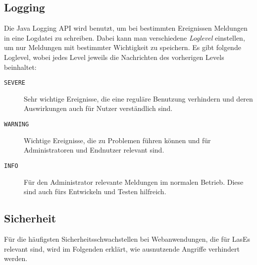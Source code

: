 
\subsection{Logging}\label{subsec:logging}
Die Java Logging API wird benutzt, um bei bestimmten Ereignissen Meldungen in eine Logdatei zu schreiben.
Dabei kann man verschiedene \emph{Loglevel} einstellen, um nur Meldungen mit bestimmter Wichtigkeit zu speichern.
Es gibt folgende Loglevel, wobei jedes Level jeweils die Nachrichten des vorherigen Levels beinhaltet:
\begin{description}
    \item[\texttt{SEVERE}] Sehr wichtige Ereignisse, die eine reguläre Benutzung verhindern und deren Auswirkungen auch für Nutzer verständlich sind.
    \item[\texttt{WARNING}] Wichtige Ereignisse, die zu Problemen führen können und für Administratoren und Endnutzer relevant sind.
    \item[\texttt{INFO}] Für den Administrator relevante Meldungen im normalen Betrieb. Diese sind auch fürs Entwickeln und Testen hilfreich.
\end{description}

\subsection{Sicherheit}\label{subsec:sicherheit}
Für die häufigsten Sicherheitsschwachstellen bei Webanwendungen, die für LasEs relevant sind, wird im Folgenden erklärt, wie ausnutzende Angriffe verhindert werden.

